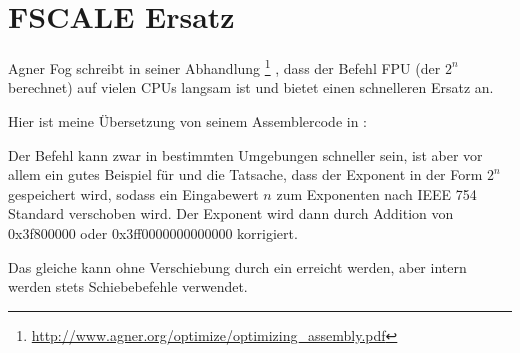 \section{FSCALE Ersatz}
Agner Fog schreibt in seiner Abhandlung  \footnote{\url{http://www.agner.org/optimize/optimizing_assembly.pdf}} , dass der Befehl 
\ac{FPU} (der $2^n$ berechnet) auf vielen CPUs langsam ist und bietet einen schnelleren Ersatz an.

Hier ist meine Übersetzung von seinem Assemblercode in \CCpp:


Der Befehl  kann zwar in bestimmten Umgebungen schneller sein, ist aber vor allem ein gutes Beispiel für
 und die Tatsache, dass der Exponent in der Form $2^n$ gespeichert wird, sodass ein Eingabewert $n$ zum
Exponenten nach IEEE 754 Standard verschoben wird.
Der Exponent wird dann durch Addition von 0x3f800000 oder 0x3ff0000000000000 korrigiert.

Das gleiche kann ohne Verschiebung durch ein  erreicht werden, aber intern werden stets Schiebebefehle
verwendet.
